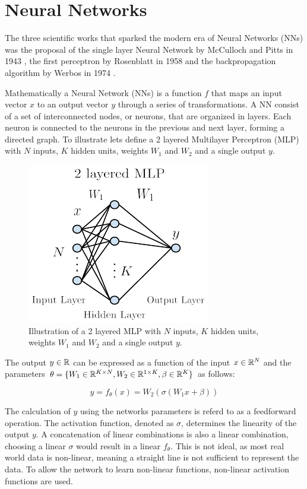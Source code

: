 

\section{Neural Networks}
The three scientific works that sparked the modern era of Neural Networks (NNs) was the proposal of the single layer Neural Network by McCulloch and Pitts in 1943 \cite{logcalc}, the first perceptron by Rosenblatt in 1958 \cite{perceptron} and the backpropagation algorithm by Werbos in 1974 \cite{backprop}.


Mathematically a Neural Network (NNs) is a function $f$ that maps an input vector $x$ to an output vector $y$ through a series of transformations. 
A NN consist of a set of interconnected nodes, or neurons, that are organized in layers. Each neuron is connected to the neurons in the previous and next layer, forming a directed graph.
To illustrate lets define a 2 layered Multilayer Perceptron (MLP) with $N$ inputs, $K$ hidden units, weights $W_1$ and $W_2$ and a single output $y$. 
\begin{figure}[H]
    \includegraphics[scale=1]{figures/figure-pdf/NN.pdf}
    \caption{Illustration of a 2 layered MLP with $N$ inputs, $K$ hidden units, weights $W_1$ and $W_2$ and a single output $y$.}
\end{figure}

The output $y \in \mathbb{R}$ can be expressed as a function of the input $x\in\mathbb{R}^N$ and the parameters $\theta=\{ W_1 \in \mathbb{R}^{K \times N}, W_2 \in \mathbb{R}^{1\times K}, \beta \in \mathbb{R}^K\}$ as follows:

\begin{equation}
    y = f_\theta(x) = W_2(\sigma(W_1 x + \beta))
\end{equation}

The calculation of $y$ using the networks parameters is referd to as a feedforward operation.
The activation function, denoted as $\sigma$, determines the linearity of the output $y$. 
A concatenation of linear combinations is also a linear combination, choosing a linear $\sigma$ would result in a linear $f_\theta$.
This is not ideal, as most real world data is non-linear, meaning a straight line is not sufficient to represent the data. 
To allow the network to learn non-linear functions, non-linear activation functions are used.

